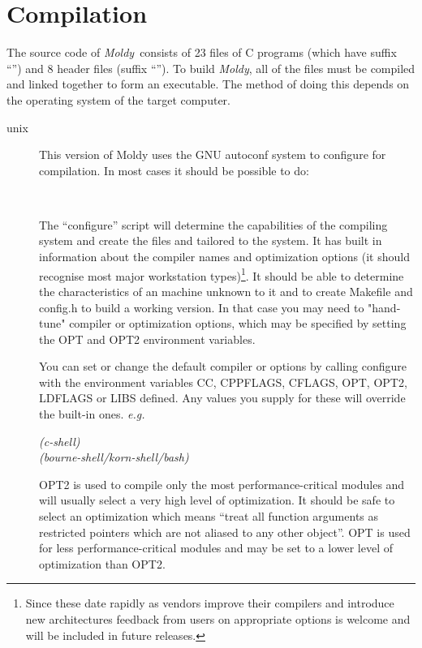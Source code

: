 \documentclass[a4paper,twoside]{report}
\newcommand{\moldy}{\emph{Moldy}}
\begin{document}
\section{Compilation}%
\label{sec:compile}
The source code of \moldy\  consists of 23 files of C programs (which have
suffix ``'') and 8 header files (suffix ``'').
To build \moldy, all of the  files must be compiled and linked
together to form an executable.  The method of doing this depends on
the operating system of the target computer.
\begin{description}
\item[unix]  
This version of Moldy uses the GNU autoconf system to configure for
compilation.   In most cases it should be possible to do:

\\

The ``configure'' script will determine the capabilities of the
compiling system and create the files  and
 tailored to the system.  It has built in information
about the compiler names and optimization options (it should recognise
most major workstation types)\footnote{Since these date rapidly as
  vendors improve their compilers and introduce new architectures
  feedback from users on appropriate options is welcome and will be
  included in future releases.}.  It should be able to determine the
characteristics of an machine unknown to it and to create Makefile and
config.h to build a working version.  In that case you may need to
"hand-tune" compiler or optimization options, which may be specified
by setting the OPT and OPT2 environment variables.

You can set or change the default compiler or options by calling
configure with the environment variables CC, CPPFLAGS, CFLAGS, OPT,
OPT2, LDFLAGS or LIBS defined.  Any values you supply for these will
override the built-in ones.  \emph{e.g.}


\begin{tabbing}
 \=    \emph{(c-shell)}\\
      \>   \emph{(bourne-shell/korn-shell/bash)}
\end{tabbing}

OPT2 is used to compile only the most performance-critical modules and
will usually select a very high level of optimization.  It should be
safe to select an optimization which means ``treat all function
arguments as restricted pointers which are not aliased to any other
object''.  OPT is used for less performance-critical modules and may be
set to a lower level of optimization than OPT2.


\end{description}
\end{document}

